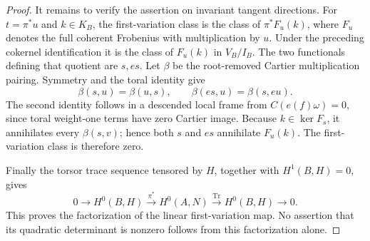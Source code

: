 \begin{proof}
It remains to verify the assertion on invariant tangent directions.
For $t=\pi^*u$ and $k\in K_B$, the first-variation class is the
class of $\pi^*F_u(k)$, where $F_u$ denotes the full coherent
Frobenius with multiplication by $u$.
Under the preceding cokernel identification it is the class of
$F_u(k)$ in $V_B/I_B$.
The two functionals defining that quotient are $s,es$.
Let $\beta$ be the root-removed Cartier multiplication pairing.
Symmetry and the toral identity give
\[
 \beta(s,u)=\beta(u,s),\qquad
 \beta(es,u)=\beta(s,eu).
\]
The second identity follows in a descended local frame from
$C(e(f)\omega)=0$, since toral weight-one terms have zero Cartier
image. Because $k\in\ker F_s$, it annihilates every
$\beta(s,v)$; hence both $s$ and $es$ annihilate $F_u(k)$.
The first-variation class is therefore zero.

Finally the torsor trace sequence tensored by $H$, together with
$H^1(B,H)=0$, gives
\[
 0\to H^0(B,H)\xrightarrow{\pi^*}H^0(A,N)
       \xrightarrow{\operatorname{Tr}}H^0(B,H)\to0.
\]
This proves the factorization of the linear first-variation map.
No assertion that its quadratic determinant is nonzero follows
from this factorization alone.
\end{proof}
